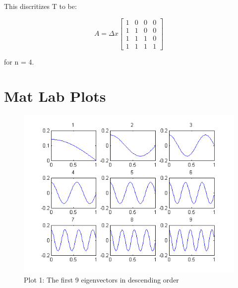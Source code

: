 \documentclass[12pt]{article}
\begin{document}
This discritizes T to be:

\[
A =
\Delta x
\begin{bmatrix}
1 & 0 & 0 & 0\\
1 & 1 & 0 & 0\\
1 & 1 & 1 & 0\\
1 & 1 & 1 & 1
\end{bmatrix}
\]

for n = 4.

\section*{Mat Lab Plots}
\begin{center}

\begin{figure}[H]
\includegraphics[scale=1]{plot1.png}
\caption{Plot 1: The first 9 eigenvectors in descending order}
\end{figure}


\end{center}
\end{document}
